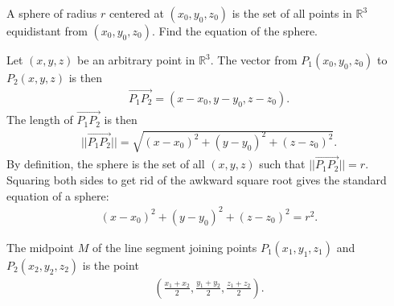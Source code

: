 \documentclass[12pt,letterpaper,reqno]{article}
\numberwithin{equation}{section}
\begin{document}
\begin{exercise}
	A sphere of radius $r$ centered at $(x_0,y_0,z_0)$ is the set of all points in $\mathbb{R}^3$ equidistant from $(x_0,y_0,z_0)$. Find the equation of the sphere.
\end{exercise}

{\color{red} 
Let $(x,y,z)$ be an arbitrary point in $\mathbb{R}^3$. The vector from $P_1(x_0,y_0,z_0)$ to $P_2(x,y,z)$ is then
\begin{align*}
	\overrightarrow{P_1P_2}=(x-x_0,y-y_0,z-z_0).
\end{align*}
The length of $\overrightarrow{P_1P_2}$ is then
\begin{align*}
	||\overrightarrow{P_1P_2}||=\sqrt{(x-x_0)^2+(y-y_0)^2+(z-z_0)^2}.
\end{align*}
By definition, the sphere is the set of all $(x,y,z)$ such that $||\overrightarrow{P_1P_2}||=r$. Squaring both sides to get rid of the awkward square root gives the standard equation of a sphere:
\begin{align*}
	(x-x_0)^2+(y-y_0)^2+(z-z_0)^2=r^2.
\end{align*}}

\begin{prop}
	The midpoint $M$ of the line segment joining points $P_1(x_1,y_1,z_1)$ and $P_2(x_2,y_2,z_2)$ is the point
	\begin{align*}
		\left(\frac{x_1+x_2}{2},\frac{y_1+y_2}{2},\frac{z_1+z_2}{2}\right).
	\end{align*}
\end{prop}
\end{document}
